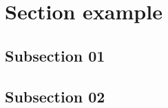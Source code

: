 \section{Section example}
\textbf{\lipsum[1]}
\subsection{Subsection 01}
\lipsum[1-3]
\subsection{Subsection 02}
\lipsum[4-6]
